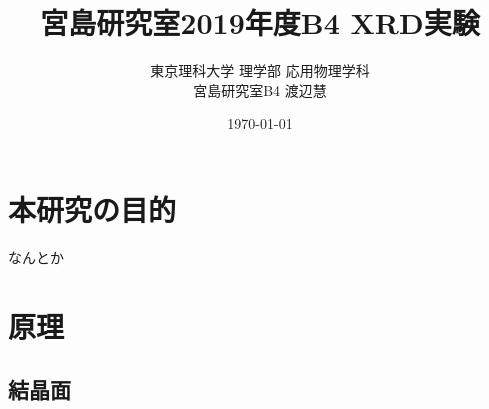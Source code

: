 \documentclass[11pt,a4j,uplatex]{jsarticle}
\title{宮島研究室2019年度B4 XRD実験}
\author{東京理科大学 理学部 応用物理学科\\宮島研究室B4 渡辺慧}
\date{\today}
\begin{document}
\maketitle %

\thispagestyle{empty}%
\clearpage
\addtocounter{page}{-1}%

\newpage

\tableofcontents %

\thispagestyle{empty}%
\clearpage
\addtocounter{page}{-1}


\newpage
\section{本研究の目的}
なんとか

\newpage
\section{原理}

\subsection{結晶面}
\end{document}
